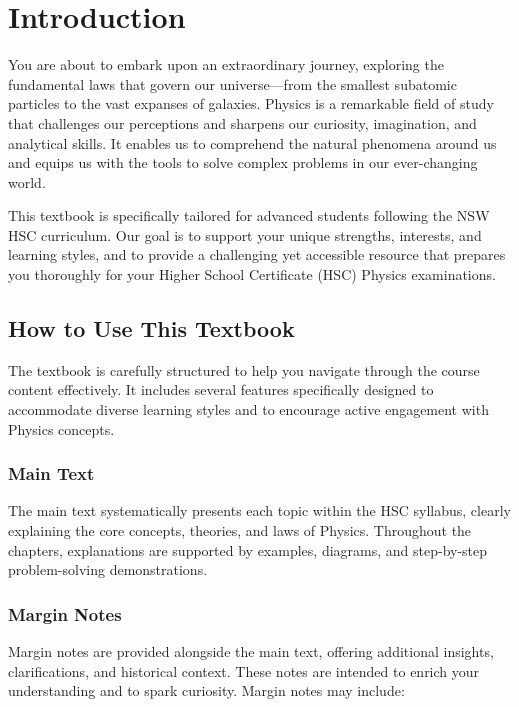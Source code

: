 \chapter{Introduction}

 You are about to embark upon an extraordinary journey, exploring the fundamental laws that govern our universe—from the smallest subatomic particles to the vast expanses of galaxies. Physics is a remarkable field of study that challenges our perceptions and sharpens our curiosity, imagination, and analytical skills. It enables us to comprehend the natural phenomena around us and equips us with the tools to solve complex problems in our ever-changing world.

This textbook is specifically tailored for advanced students following the NSW HSC curriculum. Our goal is to support your unique strengths, interests, and learning styles, and to provide a challenging yet accessible resource that prepares you thoroughly for your Higher School Certificate (HSC) Physics examinations.

\section{How to Use This Textbook}
\FloatBarrier

The textbook is carefully structured to help you navigate through the course content effectively. It includes several features specifically designed to accommodate diverse learning styles and to encourage active engagement with Physics concepts.

\subsection{Main Text}
\FloatBarrier

The main text systematically presents each topic within the HSC syllabus, clearly explaining the core concepts, theories, and laws of Physics. Throughout the chapters, explanations are supported by examples, diagrams, and step-by-step problem-solving demonstrations.

\subsection{Margin Notes}
\FloatBarrier

Margin notes are provided alongside the main text, offering additional insights, clarifications, and historical context. These notes are intended to enrich your understanding and to spark curiosity. Margin notes may include:

